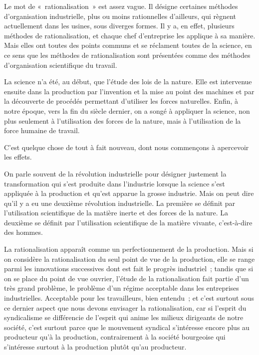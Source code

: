 \documentclass[french,twoside]{book} %
\begin{document}
\noindent \par
Le mot de « rationalisation » est assez vague. Il désigne certaines méthodes d'organisation industrielle, plus ou moins rationnelles d'ailleurs, qui règnent actuellement dans les usines, sous diverges formes. Il y a, en effet, plusieurs méthodes de rationalisation, et chaque chef d'entreprise les applique à sa manière. Mais elles ont toutes des points communs et se réclament toutes de la science, en ce sens que les méthodes de rationalisation sont présentées comme des méthodes d'organisation scientifique du travail.\par
La science n'a été, au début, que l'étude des lois de la nature. Elle est intervenue ensuite dans la production par l'invention et la mise au point des machines et par la découverte de procédés permettant d'utiliser les forces naturelles. Enfin, à notre époque, vers la fin du siècle dernier, on a songé à appliquer la science, non plus seulement à l'utilisation des forces de la nature, mais à l'utilisation de la force humaine de travail.\par
C'est quelque chose de tout à fait nouveau, dont nous commençons à apercevoir les effets.\par
\par
On parle souvent de la révolution industrielle pour désigner justement la transformation qui s'est produite dans l'industrie lorsque la science s'est appliquée à la production et qu'est apparue la grosse industrie. Mais on peut dire qu'il y a eu une deuxième révolution industrielle. La première se définit par l'utilisation scientifique de la matière inerte et des forces de la nature. La deuxième se définit par l'utilisation scientifique de la matière vivante, c'est-à-dire des hommes.\par
La rationalisation apparaît comme un perfectionnement de la production. Mais si on considère la rationalisation du seul point de vue de la production, elle se range parmi les innovations successives dont est fait le progrès industriel ; tandis que si on se place du point de vue ouvrier, l'étude de la rationalisation fait partie d'un très grand problème, le problème d'un régime acceptable dans les entreprises industrielles. Acceptable pour les travailleurs, bien entendu ; et c'est surtout sous ce dernier aspect que nous devons envisager la rationalisation, car si l'esprit du syndicalisme se différencie de l'esprit qui anime les milieux dirigeants de notre société, c'est surtout parce que le mouvement syndical s'intéresse encore plus au producteur qu'à la production, contrairement à la société bourgeoise qui s'intéresse surtout à la production plutôt qu'au producteur.\par
\end{document}
